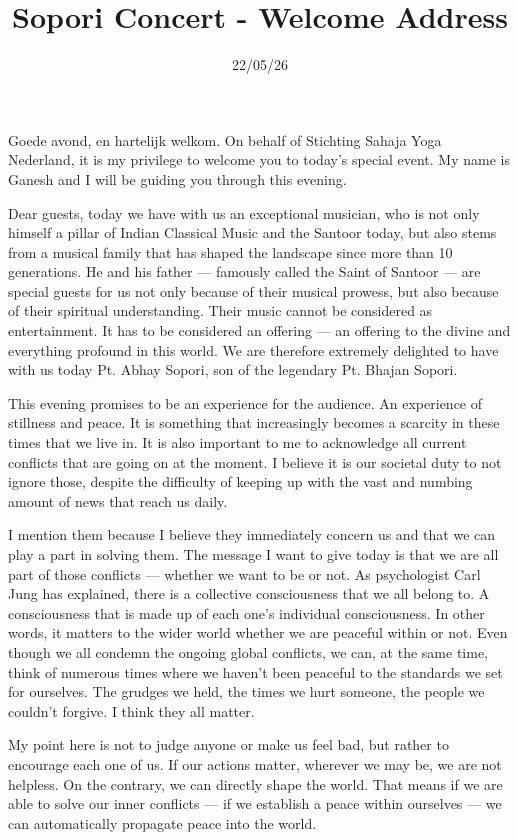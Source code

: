\documentclass[12pt]{article}
\title{Sopori Concert - Welcome Address}
\date{22/05/26}
\begin{document}
\maketitle

Goede avond, en hartelijk welkom.
On behalf of Stichting Sahaja Yoga Nederland, it is my privilege to welcome you to today's special event.
My name is Ganesh and I will be guiding you through this evening.

Dear guests, today we have with us an exceptional musician, who is not only himself a pillar of
Indian Classical Music and the Santoor today, but also stems from a musical family that has shaped
the landscape since more than 10 generations. He and his father — famously called the Saint of
Santoor — are special guests for us not only because of their musical prowess, but also because of
their spiritual understanding. Their music cannot be considered as entertainment. It has to be
considered an offering — an offering to the divine and everything profound in this world. We are
therefore extremely delighted to have with us today Pt. Abhay Sopori, son of the legendary Pt.
Bhajan Sopori.

This evening promises to be an experience for the audience. An experience of stillness and peace. It
is something that increasingly becomes a scarcity in these times that we live in. It is also important
to me to acknowledge all current conflicts that are going on at the moment. I believe it is our
societal duty to not ignore those, despite the difficulty of keeping up with the vast and numbing
amount of news that reach us daily.

I mention them because I believe they immediately concern us and that we can play a part in
solving them. The message I want to give today is that we are all part of those conflicts — whether
we want to be or not. As psychologist Carl Jung has explained, there is a collective consciousness
that we all belong to. A consciousness that is made up of each one's individual consciousness. In
other words, it matters to the wider world whether we are peaceful within or not. Even though we
all condemn the ongoing global conflicts, we can, at the same time, think of numerous times where
we haven't been peaceful to the standards we set for ourselves. The grudges we held, the times we
hurt someone, the people we couldn't forgive. I think they all matter.

My point here is not to judge anyone or make us feel bad, but rather to encourage each one of us. If
our actions matter, wherever we may be, we are not helpless. On the contrary, we can directly shape
the world. That means if we are able to solve our inner conflicts — if we establish a peace within
ourselves — we can automatically propagate peace into the world.
\end{document}
